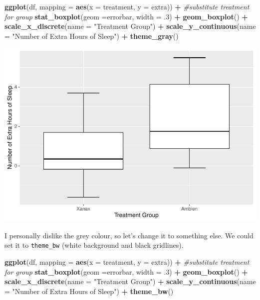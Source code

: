 \documentclass[
]{book}
\newenvironment{Shaded}{\begin{snugshade}}{\end{snugshade}}
\newcommand{\AttributeTok}[1]{\textcolor[rgb]{0.13,0.29,0.53}{#1}}
\newcommand{\CommentTok}[1]{\textcolor[rgb]{0.56,0.35,0.01}{\textit{#1}}}
\newcommand{\DecValTok}[1]{\textcolor[rgb]{0.00,0.00,0.81}{#1}}
\newcommand{\FunctionTok}[1]{\textcolor[rgb]{0.13,0.29,0.53}{\textbf{#1}}}
\newcommand{\NormalTok}[1]{#1}
\newcommand{\SpecialCharTok}[1]{\textcolor[rgb]{0.81,0.36,0.00}{\textbf{#1}}}
\newcommand{\StringTok}[1]{\textcolor[rgb]{0.31,0.60,0.02}{#1}}
\begin{document}
\begin{Shaded}
\begin{Highlighting}[]
\FunctionTok{ggplot}\NormalTok{(df, }\AttributeTok{mapping =} \FunctionTok{aes}\NormalTok{(}\AttributeTok{x =}\NormalTok{ treatment, }\AttributeTok{y =}\NormalTok{ extra)) }\SpecialCharTok{+} \CommentTok{\#substitute treatment for group}
  \FunctionTok{stat\_boxplot}\NormalTok{(}\AttributeTok{geom =}\StringTok{\textquotesingle{}errorbar\textquotesingle{}}\NormalTok{, }\AttributeTok{width =}\NormalTok{ .}\DecValTok{3}\NormalTok{) }\SpecialCharTok{+}
  \FunctionTok{geom\_boxplot}\NormalTok{() }\SpecialCharTok{+} 
  \FunctionTok{scale\_x\_discrete}\NormalTok{(}\AttributeTok{name =} \StringTok{"Treatment Group"}\NormalTok{) }\SpecialCharTok{+} 
  \FunctionTok{scale\_y\_continuous}\NormalTok{(}\AttributeTok{name =} \StringTok{"Number of Extra Hours of Sleep"}\NormalTok{) }\SpecialCharTok{+}
  \FunctionTok{theme\_gray}\NormalTok{()}
\end{Highlighting}
\end{Shaded}

\includegraphics{rintro_demo_files/figure-latex/unnamed-chunk-287-1.pdf}

I personally dislike the grey colour, so let's change it to something else. We could set it to \texttt{theme\_bw} (white background and black gridlines).

\begin{Shaded}
\begin{Highlighting}[]
\FunctionTok{ggplot}\NormalTok{(df, }\AttributeTok{mapping =} \FunctionTok{aes}\NormalTok{(}\AttributeTok{x =}\NormalTok{ treatment, }\AttributeTok{y =}\NormalTok{ extra)) }\SpecialCharTok{+} \CommentTok{\#substitute treatment for group}
  \FunctionTok{stat\_boxplot}\NormalTok{(}\AttributeTok{geom =}\StringTok{\textquotesingle{}errorbar\textquotesingle{}}\NormalTok{, }\AttributeTok{width =}\NormalTok{ .}\DecValTok{3}\NormalTok{) }\SpecialCharTok{+}
  \FunctionTok{geom\_boxplot}\NormalTok{() }\SpecialCharTok{+} 
  \FunctionTok{scale\_x\_discrete}\NormalTok{(}\AttributeTok{name =} \StringTok{"Treatment Group"}\NormalTok{) }\SpecialCharTok{+} 
  \FunctionTok{scale\_y\_continuous}\NormalTok{(}\AttributeTok{name =} \StringTok{"Number of Extra Hours of Sleep"}\NormalTok{) }\SpecialCharTok{+}
  \FunctionTok{theme\_bw}\NormalTok{()}
\end{Highlighting}
\end{Shaded}
\end{document}
